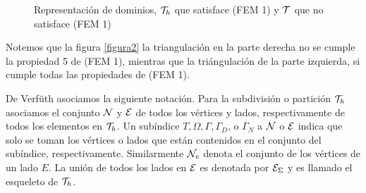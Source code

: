 \begin{figure}[h]
\begin{center}
\end{center}
\caption{Representaci\'on de dominios, ${\mathcal{T}}_{h}$ que satisface (FEM 1) y ${\mathcal{T}}$ que no satisface (FEM 1) }
\setlength{\abovecaptionskip}{0pt}
\setlength{\belowcaptionskip}{0pt}
\end{figure}

Notemos que la figura \ref{figura2} la triangulaci\'on en la parte derecha no se cumple la propiedad 5 de (FEM 1), mientras que la tri\'angulaci\'on de la parte izquierda, si cumple todas las propiedades de (FEM 1).

De Verf\"uth \cite{Rudiger2013} asociamos la siguiente notaci\'on. Para  la subdivisi\'on o partici\'on ${\mathcal{T}}_{h}$ asociamos el conjunto ${\mathcal{N}}$  y ${\mathcal{E}}$ de todos los v\'ertices  y lados, respectivamente de todos los elementos en ${\mathcal{T}}_{h}$. Un sub\'indice $T,\Omega,\Gamma, \Gamma_{D}$, o $\Gamma_{N}$ a ${\mathcal{N}}$ o ${\mathcal{E}}$ indica que solo se toman los v\'ertices o lados que est\'an contenidos en el conjunto del sub\'indice, respectivamente.  Similarmente ${\mathcal{N}}_{e}$ denota el conjunto de los v\'ertices de un lado $E$. La uni\'on de todos los lados en ${\mathcal{E}}$ es denotada por ${\mathcal{E}}_{\Sigma}$ y es llamado el esqueleto de ${\mathcal{T}}_{h}$. 

